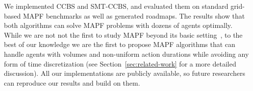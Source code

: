 \documentclass[review]{elsarticle}
\newcommand\konstantin[1]{\nb{\textbf{Konstantin:}}{red}{#1}}
\newcommand\roni[1]{\nb{\textbf{Roni:}}{green}{#1}}
\newcommand{\ccbs}{\ac{CCBS}\xspace}
\newcommand{\cbs}{\ac{CBS}\xspace}
\newcommand{\smtccbs}{SMT-CCBS\xspace}
\newcommand{\mapf}{\ac{MAPF}\xspace}
\begin{document}
We implemented \ccbs and \smtccbs, and evaluated them on standard grid-based \mapf benchmarks as well as generated roadmaps. 
The results show that both algorithms can solve \mapf problems with dozens of agents optimally. 
While we are not not the first to study \mapf beyond its basic setting~\cite{walker2018extended,li2019multi,cohen2019optimal}, to the best of our knowledge we are the first to propose \mapf algorithms that can handle agents with volumes and non-uniform action durations while avoiding any form of time discretization (see Section~\ref{sec:related-work} for a more detailed discussion).  
All our implementations are publicly available, so future researchers can reproduce our results and build on them. 


\end{document}
